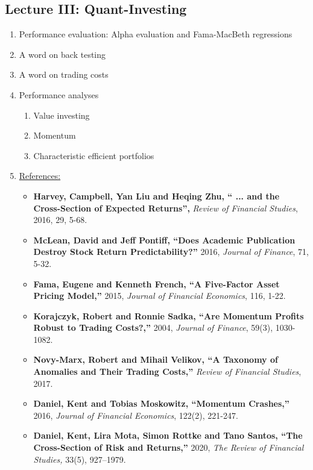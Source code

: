 \documentclass[12pts]{article}
\begin{document}
\subsection*{Lecture III: Quant-Investing}
\begin{enumerate}
	\item Performance evaluation: Alpha evaluation and Fama-MacBeth regressions
	\item A word on back testing
	\item A word on trading costs
	\item Performance analyses
	\begin{enumerate}
		\item Value investing
		\item Momentum
		\item Characteristic efficient portfolios 
	\end{enumerate}
	\item[] \hspace{-15 pt} \underline{References:}
	\begin{itemize}
		\item \textbf{Harvey, Campbell, Yan Liu and Heqing Zhu, “ ... and the Cross-Section of Expected Returns”,} \textit{Review of Financial Studies}, 2016, 29, 5-68.
		\item \textbf{McLean, David and Jeff Pontiff, “Does Academic Publication Destroy Stock Return Predictability?”} 2016, \textit{Journal of Finance}, 71, 5-32.
		\item \textbf{Fama, Eugene and Kenneth French, “A Five-Factor Asset Pricing Model,”} 2015, \textit{Journal of Financial Economics}, 116, 1-22.
		\item \textbf{Korajczyk, Robert and Ronnie Sadka, “Are Momentum Profits Robust to Trading Costs?,”} 2004, \textit{Journal of Finance}, 59(3), 1030-1082.
		\item \textbf{Novy-Marx, Robert and Mihail Velikov, “A Taxonomy of Anomalies and Their Trading Costs,”} \textit{Review of Financial Studies}, 2017.
		\item \textbf{Daniel, Kent and Tobias Moskowitz, “Momentum Crashes,”} 2016, \textit{Journal of Financial Economics}, 122(2), 221-247.
		\item \textbf{Daniel, Kent, Lira Mota, Simon Rottke and Tano Santos, “The Cross-Section of Risk and Returns,”} 2020, \textit{The Review of Financial Studies,} 33(5), 927–1979.
	\end{itemize}
\end{enumerate}	
\end{document}
